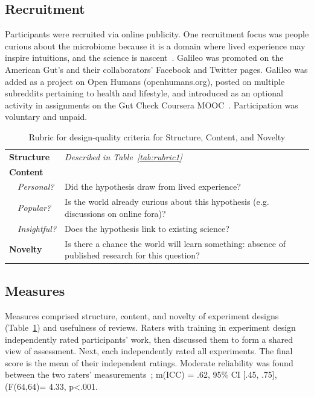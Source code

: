 \subsection*{Recruitment}
Participants were recruited via online publicity. One recruitment focus was people curious about the microbiome because it is a domain where lived experience may inspire intuitions, and the science is nascent~\cite{McDonald2018a}. Galileo was promoted on the American Gut's and their collaborators' Facebook and Twitter pages. Galileo was added as a project on Open Humans (openhumans.org), posted on multiple subreddits pertaining to health and lifestyle, and introduced as an optional activity in assignments on the Gut Check Coursera MOOC~\cite{Knight2016}. Participation was voluntary and unpaid. 


\vspace{0.25in}
\begin{table}[!ht]
\caption[Rubric for design-quality criteria for Structure, Content, and Novelty]
{Rubric for design-quality criteria for Structure, Content, and Novelty}


\vspace{-0.25in}
\begin{center}
\begin{tabular}{p{1.75in}p{4.5in}}
\textbf{Structure} &  \textit{Described in Table~\ref{tab:rubric1}} \\
\textbf{Content}  & \\
~~\textit{Personal?} & Did the hypothesis draw from lived experience? \\
~~\textit{Popular?} & Is the world already curious about this hypothesis (e.g. discussions on online fora)?  \\
~~\textit{Insightful?} & Does the hypothesis link to existing science?  \\
\textbf{Novelty}  &  Is there a chance the world will learn something: absence of published research for this question?\\
\end{tabular}
\end{center}
\label{tab:rubric2}
\end{table}

\subsection*{Measures}
Measures comprised structure, content, and novelty of experiment designs (Table~\ref{tab:rubric2}) and usefulness of reviews. Raters with training in experiment design independently rated participants' work, then discussed them to form a shared view of assessment. Next, each independently rated all experiments. The final score is the mean of their independent ratings. Moderate reliability was found between the two raters' measurements~\cite{koo2016guideline}; m(ICC) = .62, 95\% CI [.45, .75], (F(64,64)= 4.33, p<.001. 

